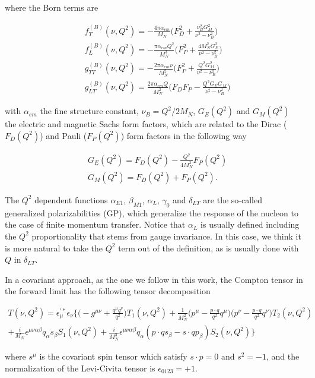 \documentclass[prc,twocolumn,showpacs,preprintnumbers,amsmath,amssymb
,superscriptaddress,a4paper,nofootinbib
]{revtex4-1}
\begin{document}
where the Born terms are \cite{Drechsel:2002ar}

\begin{align}
 & f_T^{(B)}(\nu, Q^2) =  - \frac{4\pi \alpha_{em}}{M_N} \Big( F_D^2 + \frac{\nu_B^2 G_M^2}{\nu^2-\nu_B^2} \Big) \label{Eq:BT-fT}\\
  &  f_L^{(B)}(\nu, Q^2) = - \frac{\pi \alpha_{em} Q^2}{ M_N^3} \Big( F_P^2 + \frac{4M_N^2 G_E^2}{\nu^2-\nu_B^2} \Big) \label{Eq:BT-fL}\\
 & g^{(B)}_{TT}(\nu, Q^2) = - \frac{2\pi \alpha_{em} \nu}{ M_N^2} \Big( F_P^2 + \frac{Q^2 G_M^2}{\nu^2-\nu_B^2} \Big) \label{Eq:BT-gTT}\\
 & g^{(B)}_{LT}(\nu, Q^2) =  \frac{2 \pi\alpha_{em} Q}{M_N^2} \Big( F_D F_P - \frac{Q^2 G_E G_M }{\nu^2-\nu_B^2} \Big) \label{Eq:BT-gTL}
\end{align}

with $\alpha_{em}$ the fine structure constant, $\nu_B=Q^2/2M_N$, $G_E(Q^2)$ and $G_M(Q^2)$ the electric and magnetic Sachs form factors, which are related to the Dirac ($F_D(Q^2)$) and Pauli ($F_P(Q^2)$) form factors in the following way

\begin{align}
& G_E(Q^2)=F_D(Q^2) - \frac{Q^2}{4M_N^2} F_P(Q^2)\\
& G_M(Q^2)=F_D(Q^2) + F_P(Q^2).
\end{align}



The $Q^2$ dependent functions $\alpha_{E1}$, $\beta_{M1}$, $\alpha_{L}$, $\gamma_{0}$ and $\delta_{LT}$ are the so-called generalized polarizabilities (GP), which generalize the response of the nucleon to the case of finite momentum transfer. Notice that $\alpha_L$ is usually defined including the $Q^2$ proportionality that stems from gauge invariance. 
In this case, we think it is more natural to take the $Q^2$ term out of the definition, as is usually done with $Q$ in $\delta_{LT}$.

In a covariant approach, as the one we follow in this work, the Compton tensor in the forward limit has the following tensor decomposition

\begin{widetext}
\begin{align}\label{Eq:T-Rel}
T(\nu,Q^2) = \epsilon_{\mu}^{\prime *} \epsilon_\nu \Big\{  \Big( -g^{\mu \nu} + \frac{q^\mu q^\nu}{q^2} \Big) T_1(\nu,Q^2) + \frac{1}{M_N^2} \Big(  p^\mu - \frac{p\cdot q}{q^2} q^\mu \Big) \Big(  p^\nu - \frac{p\cdot q}{q^2} q^\nu \Big) T_2(\nu,Q^2) \nonumber \\ 
                  +  \frac{i}{M_N} \epsilon^{\mu \nu \alpha \beta} q_\alpha s_\beta S_1(\nu,Q^2)   +\frac{i}{M_N^3} \epsilon^{\mu \nu \alpha \beta} q_\alpha (p\cdot q  s_\beta -s\cdot q  p_\beta ) S_2(\nu,Q^2)      \Big\} 
\end{align}
\end{widetext}
where $s^\mu$ is the covariant spin tensor which satisfy $s\cdot p=0$ and $s^2=-1$, and the normalization of the Levi-Civita tensor is $\epsilon_{0123}=+1$. 
\end{document}
